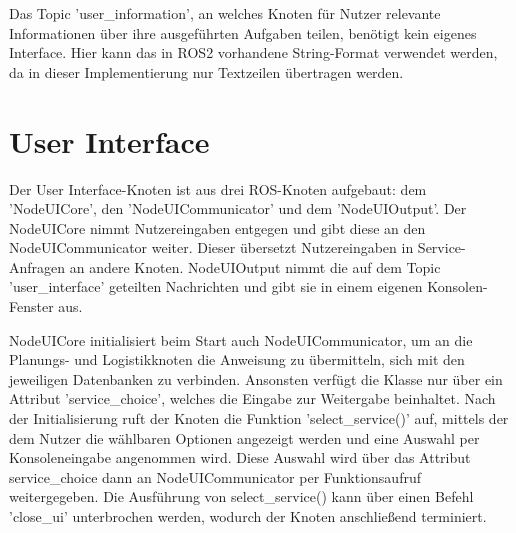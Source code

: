 Das Topic 'user\_information', an welches Knoten für Nutzer relevante Informationen über ihre ausgeführten Aufgaben teilen, benötigt kein eigenes Interface. Hier kann das in ROS2 vorhandene String-Format verwendet werden, da in dieser Implementierung nur Textzeilen übertragen werden.


\FloatBarrier
\section{User Interface}

Der User Interface-Knoten ist aus drei ROS-Knoten aufgebaut: dem 'NodeUICore', den 'NodeUICommunicator' und dem 'NodeUIOutput'. Der NodeUICore nimmt Nutzereingaben entgegen und gibt diese an den NodeUICommunicator weiter. Dieser übersetzt Nutzereingaben in Service-Anfragen an andere Knoten. NodeUIOutput nimmt die auf dem Topic 'user\_interface' geteilten Nachrichten und gibt sie in einem eigenen Konsolen-Fenster aus.

NodeUICore initialisiert beim Start auch NodeUICommunicator, um an die Planungs- und Logistikknoten die Anweisung zu übermitteln, sich mit den jeweiligen Datenbanken zu verbinden. Ansonsten verfügt die Klasse nur über ein Attribut 'service\_choice', welches die Eingabe zur Weitergabe beinhaltet. Nach der Initialisierung ruft der Knoten die Funktion 'select\_service()' auf, mittels der dem Nutzer die wählbaren Optionen angezeigt werden und eine Auswahl per Konsoleneingabe angenommen wird. Diese Auswahl wird über das Attribut service\_choice dann an NodeUICommunicator per Funktionsaufruf weitergegeben. Die Ausführung von select\_service() kann über einen Befehl 'close\_ui' unterbrochen werden, wodurch der Knoten anschließend terminiert.

